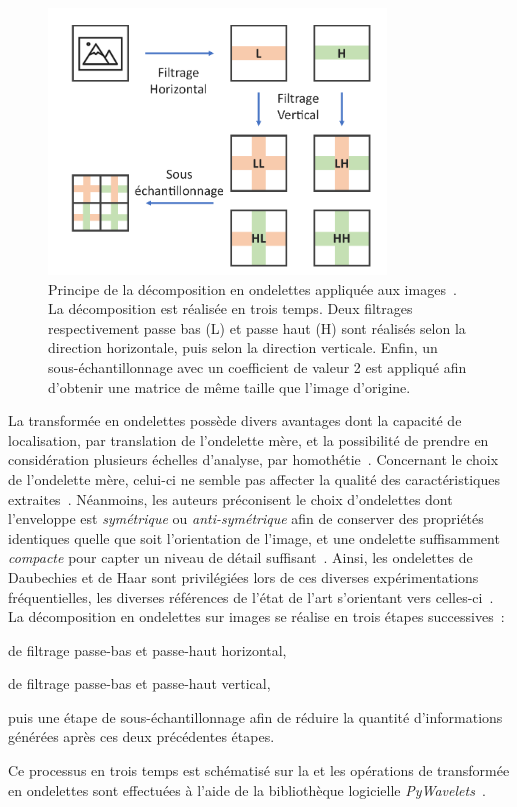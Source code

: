 \begin{figure}[H]
    \centering
    \includegraphics[width=0.8\textwidth]{contents/chapter_5/resources/scheme_dwt.pdf}
    \caption{Principe de la décomposition en ondelettes appliquée aux images~\cite{Livens1997}. La décomposition est réalisée en trois temps. Deux filtrages respectivement passe bas (L) et passe haut (H) sont réalisés selon la direction horizontale, puis selon la direction verticale. Enfin, un sous-échantillonnage avec un coefficient de valeur 2 est appliqué afin d'obtenir une matrice de même taille que l'image d'origine.}
    \label{fig:scheme_dwt}
\end{figure}\par 

La transformée en ondelettes possède divers avantages dont la capacité de localisation, par translation de l'ondelette mère, et la possibilité de prendre en considération plusieurs échelles d'analyse, par homothétie~\cite{Livens1997,Wiltgen2008}. Concernant le choix de l'ondelette mère, celui-ci ne semble pas affecter la qualité des caractéristiques extraites~\cite{Fatemi1996, Livens1997}. Néanmoins, les auteurs préconisent le choix d'ondelettes dont l'enveloppe est \textit{symétrique} ou \textit{anti-symétrique} afin de conserver des propriétés identiques quelle que soit l'orientation de l'image, et une ondelette suffisamment \textit{compacte} pour capter un niveau de détail suffisant~\cite{Livens1997}. Ainsi, les ondelettes de Daubechies et de Haar sont privilégiées lors de ces diverses expérimentations fréquentielles, les diverses références de l'état de l'art s'orientant vers celles-ci~\cite{Wiltgen2008,Halimi2017a}. La décomposition en ondelettes sur images se réalise en trois étapes successives~:~
\begin{inlinerate}
    \item de filtrage passe-bas et passe-haut horizontal,
    \item de filtrage passe-bas et passe-haut vertical,
    \item puis une étape de sous-échantillonnage afin de réduire la quantité d'informations générées après ces deux précédentes étapes.
\end{inlinerate} Ce processus en trois temps est schématisé sur la  et les opérations de transformée en ondelettes sont effectuées à l'aide de la bibliothèque logicielle \textit{PyWavelets}~\cite{lee2006}.\par

